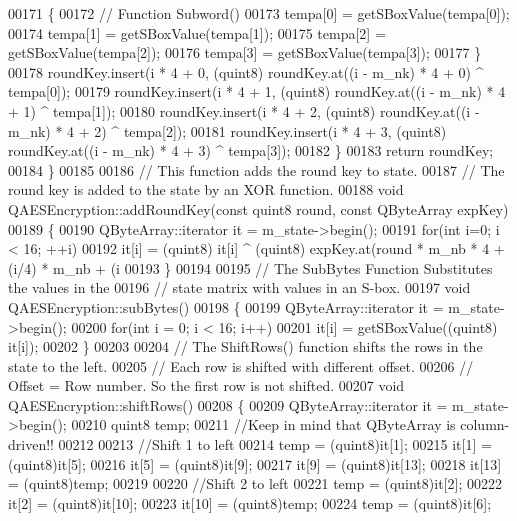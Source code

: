 \begin{DoxyCode}
00171     \{
00172         \textcolor{comment}{// Function Subword()}
00173         tempa[0] = getSBoxValue(tempa[0]);
00174         tempa[1] = getSBoxValue(tempa[1]);
00175         tempa[2] = getSBoxValue(tempa[2]);
00176         tempa[3] = getSBoxValue(tempa[3]);
00177     \}
00178     roundKey.insert(i * 4 + 0, (quint8) roundKey.at((i - m\_nk) * 4 + 0) ^ tempa[0]);
00179     roundKey.insert(i * 4 + 1, (quint8) roundKey.at((i - m\_nk) * 4 + 1) ^ tempa[1]);
00180     roundKey.insert(i * 4 + 2, (quint8) roundKey.at((i - m\_nk) * 4 + 2) ^ tempa[2]);
00181     roundKey.insert(i * 4 + 3, (quint8) roundKey.at((i - m\_nk) * 4 + 3) ^ tempa[3]);
00182   \}
00183   \textcolor{keywordflow}{return} roundKey;
00184 \}
00185 
00186 \textcolor{comment}{// This function adds the round key to state.}
00187 \textcolor{comment}{// The round key is added to the state by an XOR function.}
00188 \textcolor{keywordtype}{void} QAESEncryption::addRoundKey(\textcolor{keyword}{const} quint8 round, \textcolor{keyword}{const} QByteArray expKey)
00189 \{
00190   QByteArray::iterator it = m\_state->begin();
00191   \textcolor{keywordflow}{for}(\textcolor{keywordtype}{int} i=0; i < 16; ++i)
00192       it[i] = (quint8) it[i] ^ (quint8) expKey.at(round * m\_nb * 4 + (i/4) * m\_nb + (i%
00193 \}
00194 
00195 \textcolor{comment}{// The SubBytes Function Substitutes the values in the}
00196 \textcolor{comment}{// state matrix with values in an S-box.}
00197 \textcolor{keywordtype}{void} QAESEncryption::subBytes()
00198 \{
00199   QByteArray::iterator it = m\_state->begin();
00200   \textcolor{keywordflow}{for}(\textcolor{keywordtype}{int} i = 0; i < 16; i++)
00201     it[i] = getSBoxValue((quint8) it[i]);
00202 \}
00203 
00204 \textcolor{comment}{// The ShiftRows() function shifts the rows in the state to the left.}
00205 \textcolor{comment}{// Each row is shifted with different offset.}
00206 \textcolor{comment}{// Offset = Row number. So the first row is not shifted.}
00207 \textcolor{keywordtype}{void} QAESEncryption::shiftRows()
00208 \{
00209     QByteArray::iterator it = m\_state->begin();
00210     quint8 temp;
00211     \textcolor{comment}{//Keep in mind that QByteArray is column-driven!!}
00212 
00213      \textcolor{comment}{//Shift 1 to left}
00214     temp   = (quint8)it[1];
00215     it[1]  = (quint8)it[5];
00216     it[5]  = (quint8)it[9];
00217     it[9]  = (quint8)it[13];
00218     it[13] = (quint8)temp;
00219 
00220     \textcolor{comment}{//Shift 2 to left}
00221     temp   = (quint8)it[2];
00222     it[2]  = (quint8)it[10];
00223     it[10] = (quint8)temp;
00224     temp   = (quint8)it[6];

\end{DoxyCode}
